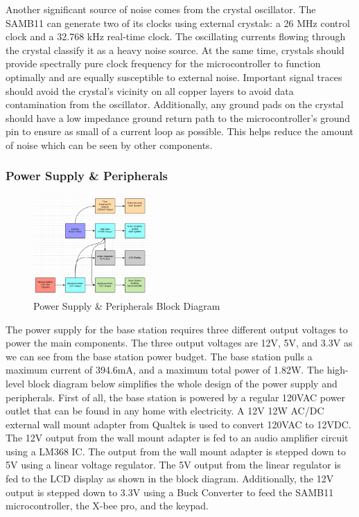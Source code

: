 \documentclass[journal,compsoc]{IEEEtran}
\begin{document}
Another significant source of noise comes from the crystal oscillator.  The SAMB11 can generate two of its clocks using external crystals: a 26 MHz control clock and a 32.768 kHz real-time clock.  The oscillating currents flowing through the crystal classify it as a heavy noise source.  At the same time, crystals should provide spectrally pure clock frequency for the microcontroller to function optimally and are equally susceptible to external noise.  Important signal traces should avoid the crystal’s vicinity on all copper layers to avoid data contamination from the oscillator.  Additionally, any ground pads on the crystal should have a low impedance ground return path to the microcontroller’s ground pin to ensure as small of a current loop as possible.  This helps reduce the amount of noise which can be seen by other components.

\subsubsection {Power Supply \& Peripherals}

\begin{figure}[ht] 	%
\centering
\includegraphics[width=0.4\textwidth]{BlockDiagram.png}
\caption{ \space Power Supply \& Peripherals Block Diagram}
\label{Psupply}
\end{figure}

The power supply for the base station requires three different output voltages to power the main components. The three output voltages are 12V, 5V, and 3.3V as we can see from the base station power budget. The base station pulls a maximum current of 394.6mA, and a maximum total power of 1.82W. The high-level block diagram below simplifies the whole design of the power supply and peripherals. First of all, the base station is powered by a regular 120VAC power outlet that can be found in any home with electricity. A 12V 12W AC/DC external wall mount adapter from Qualtek is used to convert 120VAC to 12VDC. The 12V output from the wall mount adapter is fed to an audio amplifier circuit using a LM368 IC. The output from the wall mount adapter is stepped down to 5V using a linear voltage regulator. The 5V output from the linear regulator is fed to the LCD display as shown in the block diagram. Additionally, the 12V output is stepped down to 3.3V using a Buck Converter to feed the SAMB11 microcontroller, the X-bee pro, and the keypad. 
\end{document}
